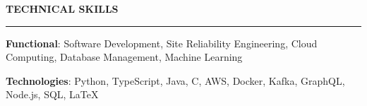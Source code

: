 \documentclass{cv}
\begin{document}

\sectionskip


\textbf{\uppercase{Technical Skills}}
\sectionlineskip
\hrule height 1.0pt
\begin{list}{}{\setlength{\leftmargin}{0pt}}
\itemsep -2.0pt
\item
    \textbf{Functional}: Software Development, Site Reliability Engineering, Cloud Computing, Database Management, Machine Learning
\item
    \textbf{Technologies}: Python, TypeScript, Java, C, AWS, Docker, Kafka, GraphQL, Node.js, SQL, \LaTeX
\end{list}


\sectionskip

\end{document}
